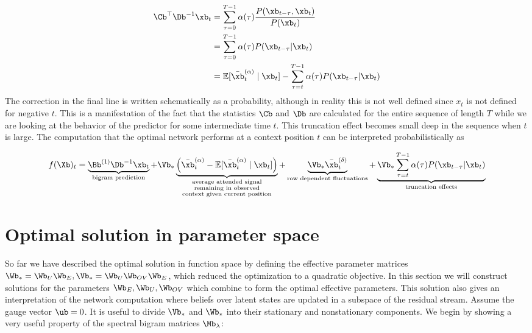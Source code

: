 \documentclass{article}
\begin{document}
\begin{align}
 \Cb^\top\Db^{-1} \xb_t &= \sum_{\tau = 0}^{T-1} \alpha(\tau) \frac{P(\xb_{t-\tau}, \xb_t)}{P({\xb_{t}})} \\
 &= \sum_{\tau = 0}^{T-1} \alpha(\tau) P(\xb_{t-\tau} | \xb_{t}) \\
 &= \mathbb{E}[\bar{\xb}_t^{(\alpha)} \mid \xb_t] -  \sum_{\tau = t}^{T-1} \alpha(\tau) P(\xb_{t-\tau} | \xb_{t})
\end{align}
The correction in the final line is written schematically as a probability, although in reality this is not well defined since $x_t$ is not defined for negative $t$. This is a manifestation of the fact that the statistics $\Cb$ and $\Db$ are calculated for the entire sequence of length $T$ while we are looking at the behavior of the predictor for some intermediate time $t$. This truncation effect becomes small deep in the sequence when $t$ is large. The computation that the optimal network performs at a context position $t$ can be interpreted probabilistically as

\begin{equation}
    f(\Xb)_t = \underbrace{\Bb^{(1)}\Db^{-1}\xb_t}_{\text{bigram prediction}} + \Vb_* \underbrace{\left ( \bar{\xb}_t^{(\alpha)} -  \mathbb{E}[\bar{\xb}_t^{(\alpha)} \mid \xb_t] \right )}_{\substack{\text{average attended signal} \\ \text{remaining in observed} \\\text{context given current position}}} + \underbrace{  \Vb_*\bar{\xb}_t^{(\delta)}}_{\text{row dependent fluctuations}} + \underbrace{ \Vb_*\sum_{\tau = t}^{T-1} \alpha(\tau) P(\xb_{t-\tau} | \xb_{t})}_{\text{truncation effects}}
\end{equation}



\section{Optimal solution in parameter space}
So far we have described the optimal solution in function space by defining the effective parameter matrices $\Wb_* = \Wb_U\Wb_E, \Vb_* = \Wb_U \Wb_{OV}\Wb_E$, which reduced the optimization to a quadratic objective. In this section we will construct solutions for the parameters $\Wb_E, \Wb_U, \Wb_{OV}$ which combine to form the optimal effective parameters. This solution also gives an interpretation of the network computation where beliefs over latent states are updated in a subspace of the residual stream. Assume the gauge vector $\ub = 0$. It is useful to divide $\Vb_*$ and $\Wb_*$ into their stationary and nonstationary components. We begin by showing a very useful property of the spectral bigram matrices $\Mb_\lambda$:
\end{document}

